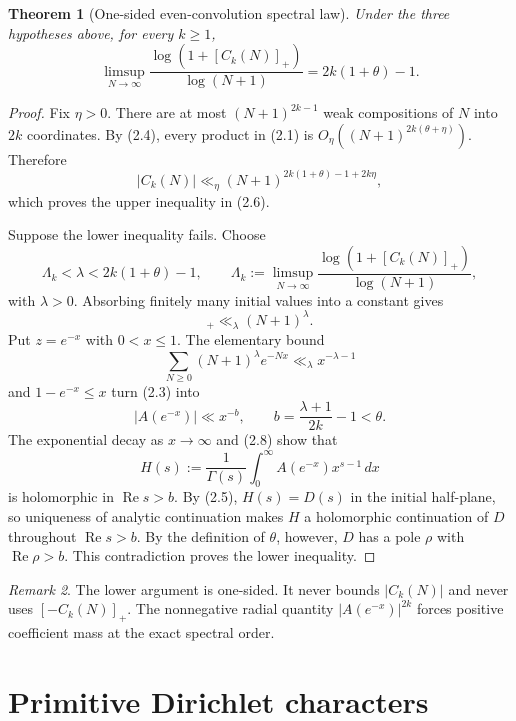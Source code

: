 \documentclass[11pt]{article}
\newtheorem{theorem}{Theorem}[section]
\theoremstyle{remark}
\newtheorem{remark}[theorem]{Remark}
\newcommand{\Rea}{\operatorname{Re}}
\begin{document}
\begin{theorem}[One-sided even-convolution spectral law]
\label{thm:abstract}
Under the three hypotheses above, for every $k\geq1$,
\begin{equation}
 \limsup_{N\to\infty}
 \frac{\log(1+[C_k(N)]_+)}{\log(N+1)}
 =2k(1+\theta)-1.
 \tag{2.6}
\end{equation}
\end{theorem}

\begin{proof}
Fix $\eta>0$.  There are at most $(N+1)^{2k-1}$ weak compositions of $N$ into $2k$
coordinates.  By (2.4), every product in (2.1) is
$O_\eta((N+1)^{2k(\theta+\eta)})$.  Therefore
\[
 |C_k(N)|\ll_\eta
 (N+1)^{2k(1+\theta)-1+2k\eta},
\]
which proves the upper inequality in (2.6).

Suppose the lower inequality fails.  Choose
\[
 \Lambda_k<\lambda<2k(1+\theta)-1,
 \qquad
 \Lambda_k:=\limsup_{N\to\infty}
 \frac{\log(1+[C_k(N)]_+)}{\log(N+1)},
\]
with $\lambda>0$.  Absorbing finitely many initial values into a constant gives
\begin{equation}
 [C_k(N)]_+\ll_\lambda(N+1)^\lambda.
 \tag{2.7}
\end{equation}
Put $z=e^{-x}$ with $0<x\leq1$.  The elementary bound
\[
 \sum_{N\geq0}(N+1)^\lambda e^{-Nx}\ll_\lambda x^{-\lambda-1}
\]
and $1-e^{-x}\leq x$ turn (2.3) into
\begin{equation}
 |A(e^{-x})|\ll x^{-b},
 \qquad
 b=\frac{\lambda+1}{2k}-1<\theta.
 \tag{2.8}
\end{equation}
The exponential decay as $x\to\infty$ and (2.8) show that
\[
 H(s):=\frac1{\Gamma(s)}\int_0^\infty A(e^{-x})x^{s-1}\,dx
\]
is holomorphic in $\Rea s>b$.  By (2.5), $H(s)=D(s)$ in the initial half-plane, so uniqueness
of analytic continuation makes $H$ a holomorphic continuation of $D$ throughout
$\Rea s>b$.  By the definition of $\theta$, however, $D$ has a pole $\rho$ with
$\Rea\rho>b$.  This contradiction proves the lower inequality.
\end{proof}

\begin{remark}
The lower argument is one-sided.  It never bounds $|C_k(N)|$ and never uses
$[{-C_k(N)}]_+$.  The nonnegative radial quantity $|A(e^{-x})|^{2k}$ forces positive
coefficient mass at the exact spectral order.
\end{remark}

\section{Primitive Dirichlet characters}
\label{sec:dirichlet}
\end{document}
